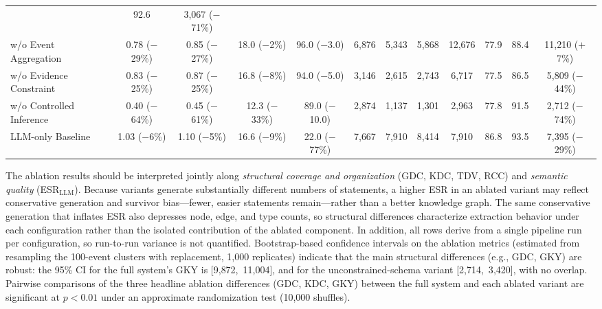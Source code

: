 \documentclass[a4paper,fleqn]{cas-dc}
\begin{document}
\begin{table}[t]
{\begin{tabular}{lcccccccc cc c}
      & 92.6
      & 3{,}067 {\scriptsize($-$71\%)}  \\
    w/o Event Aggregation
      & 0.78 {\scriptsize($-$29\%)}
      & 0.85 {\scriptsize($-$27\%)}
      & 18.0 {\scriptsize($-$2\%)}
      & 96.0 {\scriptsize($-$3.0)}
      & 6{,}876
      & 5{,}343
      & 5{,}868
      & 12{,}676
      & 77.9
      & 88.4
      & 11{,}210 {\scriptsize($+$7\%)}  \\
    w/o Evidence Constraint
      & 0.83 {\scriptsize($-$25\%)}
      & 0.87 {\scriptsize($-$25\%)}
      & 16.8 {\scriptsize($-$8\%)}
      & 94.0 {\scriptsize($-$5.0)}
      & 3{,}146
      & 2{,}615
      & 2{,}743
      & 6{,}717
      & 77.5
      & 86.5
      & 5{,}809 {\scriptsize($-$44\%)}  \\
    w/o Controlled Inference
      & 0.40 {\scriptsize($-$64\%)}
      & 0.45 {\scriptsize($-$61\%)}
      & 12.3 {\scriptsize($-$33\%)}
      & 89.0 {\scriptsize($-$10.0)}
      & 2{,}874
      & 1{,}137
      & 1{,}301
      & 2{,}963
      & 77.8
      & 91.5
      & 2{,}712 {\scriptsize($-$74\%)}  \\
    \midrule
    LLM-only Baseline
      & 1.03 {\scriptsize($-$6\%)}
      & 1.10 {\scriptsize($-$5\%)}
      & 16.6 {\scriptsize($-$9\%)}
      & 22.0 {\scriptsize($-$77\%)}
      & 7{,}667
      & 7{,}910
      & 8{,}414
      & 7{,}910
      & 86.8
      & 93.5
      & 7{,}395 {\scriptsize($-$29\%)}  \\
    \bottomrule
  \end{tabular}%
  }
\end{table}

The ablation results should be interpreted jointly along
\emph{structural coverage and organization} (GDC, KDC, TDV, RCC) and
\emph{semantic quality} (ESR$_{\text{LLM}}$).
Because variants generate substantially different numbers of
statements, a higher ESR in an ablated variant may reflect
conservative generation and survivor bias---fewer, easier statements
remain---rather than a better knowledge graph.
The same conservative generation that inflates ESR also depresses
node, edge, and type counts, so structural differences characterize
extraction behavior under each configuration rather than the isolated
contribution of the ablated component.
In addition, all rows derive from a single pipeline run per
configuration, so run-to-run variance is not quantified.
Bootstrap-based confidence intervals on the ablation metrics
(estimated from resampling the 100-event clusters with replacement,
1{,}000 replicates) indicate that the main structural differences
(e.g., GDC, GKY) are robust: the 95\% CI for the full system's GKY
is [9{,}872,~11{,}004], and for the unconstrained-schema variant
[2{,}714,~3{,}420], with no overlap. Pairwise comparisons of the
three headline ablation differences (GDC, KDC, GKY) between the full
system and each ablated variant are significant at $p < 0.01$ under
an approximate randomization test (10{,}000 shuffles).
\end{document}
